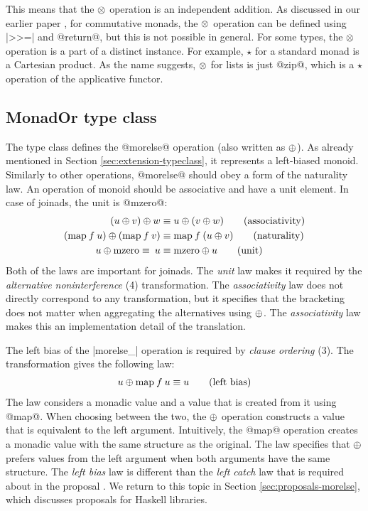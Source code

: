 \documentclass[preprint]{sigplanconf}
\begin{document}
This means that the $\otimes$ operation is an independent addition. As discussed in our earlier
paper \cite{joinads}, for commutative monads, the $\otimes$ operation can be defined using |>>=|
and @return@, but this is not possible in general. For some types, the $\otimes$ operation is a 
part of a distinct  instance. For example, $\star$ for a standard 
monad is a Cartesian product. As the name suggests, $\otimes$ for lists is just @zip@, which is 
a $\star$ operation of the  applicative functor.


\subsection{MonadOr type class}
\label{sec:laws-monador}

The  type class defines the @morelse@ operation (also written as $\oplus$). As
already mentioned in Section \ref{sec:extension-typeclass}, it represents a left-biased monoid.
Similarly to other operations, @morelse@ should obey a form of the naturality law. An operation of 
monoid should be associative and have a unit element. In case of joinads, the unit is @mzero@:
\begin{align*}
  (u \oplus v) \oplus w &\equiv u \oplus (v \oplus w) \tag{associativity} \\
  (\text{map} \: f \: u) \oplus (\text{map} \: f \: v) &\equiv \text{map} \: f \: (u \oplus v) \tag{naturality} \\
  u \oplus \text{mzero} \equiv \: u &\equiv \text{mzero} \oplus u \tag{unit}
\end{align*}
Both of the laws are important for joinads. The \textit{unit} law makes it required by the
\textit{alternative noninterference} (4) transformation. The \textit{associativity} law does not 
directly correspond to any transformation, but it specifies that the bracketing does not matter when
aggregating the alternatives using $\oplus$. The \textit{associativity} law makes this an 
implementation detail of the translation.

The left bias of the |morelse_| operation is required by \textit{clause ordering} (3).
The transformation gives the following law:
\begin{align*}
  u \oplus \text{map} \: f \: u \equiv u \tag{left bias}
\end{align*}
The law considers a monadic value and a value that is created from it using @map@. When choosing 
between the two, the $\oplus$ operation constructs a value that is equivalent to the left 
argument. Intuitively, the @map@ operation creates a monadic value with the same structure as the 
original. The law specifies that $\oplus$ prefers values from the left argument when both 
arguments have the same structure.
The \textit{left bias} law is different than the \textit{left catch} law that is 
required about  in the proposal \cite{monadplusreform}. We return to this topic in 
Section \ref{sec:proposals-morelse}, which discusses proposals for Haskell libraries.
\end{document}
